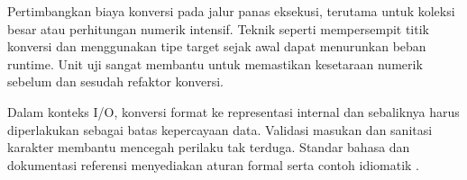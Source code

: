 \documentclass[../main.tex]{subfiles}
\begin{document}
Pertimbangkan biaya konversi pada jalur panas eksekusi, terutama untuk koleksi besar atau perhitungan numerik intensif. Teknik seperti mempersempit titik konversi dan menggunakan tipe target sejak awal dapat menurunkan beban runtime. Unit uji sangat membantu untuk memastikan kesetaraan numerik sebelum dan sesudah refaktor konversi.

Dalam konteks I/O, konversi format ke representasi internal dan sebaliknya harus diperlakukan sebagai batas kepercayaan data. Validasi masukan dan sanitasi karakter membantu mencegah perilaku tak terduga. Standar bahasa dan dokumentasi referensi menyediakan aturan formal serta contoh idiomatik \parencite{iso-c-draft-n1570,cpp-reference}.
\end{document}
